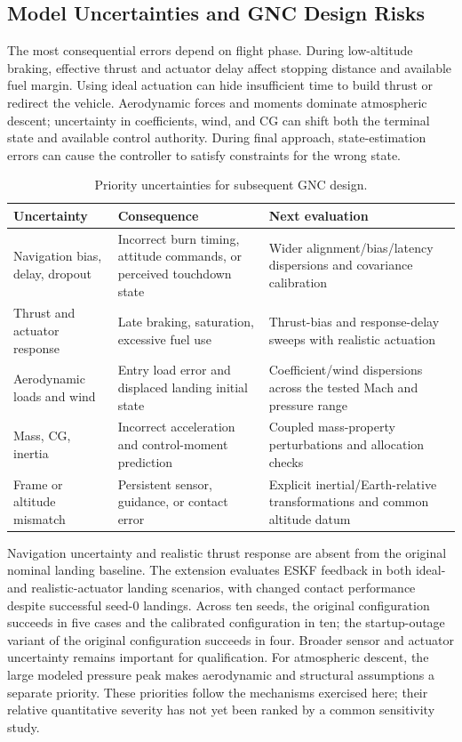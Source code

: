 \documentclass[11pt,letterpaper]{article}
\begin{document}
\subsection{Model Uncertainties and GNC Design Risks}
The most consequential errors depend on flight phase. During low-altitude braking, effective thrust and actuator delay affect stopping distance and available fuel margin. Using ideal actuation can hide insufficient time to build thrust or redirect the vehicle. Aerodynamic forces and moments dominate atmospheric descent; uncertainty in coefficients, wind, and CG can shift both the terminal state and available control authority. During final approach, state-estimation errors can cause the controller to satisfy constraints for the wrong state.
\begin{table}[!htbp]
\centering\small
\caption{Priority uncertainties for subsequent GNC design.}\label{tab:risks}
\begin{tabularx}{\textwidth}{>{\raggedright\arraybackslash}p{}YY}\toprule
Uncertainty & Consequence & Next evaluation\\\midrule
Navigation bias, delay, dropout & Incorrect burn timing, attitude commands, or perceived touchdown state & Wider alignment/bias/latency dispersions and covariance calibration\\
Thrust and actuator response & Late braking, saturation, excessive fuel use & Thrust-bias and response-delay sweeps with realistic actuation\\
Aerodynamic loads and wind & Entry load error and displaced landing initial state & Coefficient/wind dispersions across the tested Mach and pressure range\\
Mass, CG, inertia & Incorrect acceleration and control-moment prediction & Coupled mass-property perturbations and allocation checks\\
Frame or altitude mismatch & Persistent sensor, guidance, or contact error & Explicit inertial/Earth-relative transformations and common altitude datum\\\bottomrule
\end{tabularx}
\end{table}

Navigation uncertainty and realistic thrust response are absent from the original nominal landing baseline. The extension evaluates ESKF feedback in both ideal- and realistic-actuator landing scenarios, with changed contact performance despite successful seed-0 landings. Across ten seeds, the original configuration succeeds in five cases and the calibrated configuration in ten; the startup-outage variant of the original configuration succeeds in four. Broader sensor and actuator uncertainty remains important for qualification. For atmospheric descent, the large modeled pressure peak makes aerodynamic and structural assumptions a separate priority. These priorities follow the mechanisms exercised here; their relative quantitative severity has not yet been ranked by a common sensitivity study.
\end{document}
